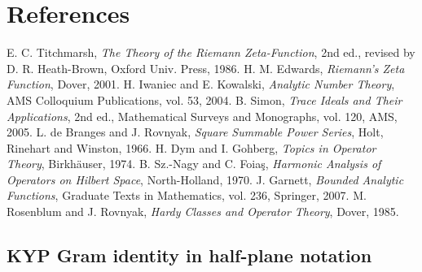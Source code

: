 \documentclass[11pt]{article}
\theoremstyle{definition}
\theoremstyle{remark}
\begin{document}
\section*{References}
\begin{thebibliography}{9}
 E. C. Titchmarsh, \emph{The Theory of the Riemann Zeta-Function}, 2nd ed., revised by D. R. Heath-Brown, Oxford Univ. Press, 1986.
 H. M. Edwards, \emph{Riemann's Zeta Function}, Dover, 2001.
 H. Iwaniec and E. Kowalski, \emph{Analytic Number Theory}, AMS Colloquium Publications, vol. 53, 2004.
 B. Simon, \emph{Trace Ideals and Their Applications}, 2nd ed., Mathematical Surveys and Monographs, vol. 120, AMS, 2005.
 L. de Branges and J. Rovnyak, \emph{Square Summable Power Series}, Holt, Rinehart and Winston, 1966.
 H. Dym and I. Gohberg, \emph{Topics in Operator Theory}, Birkhäuser, 1974.
 B. Sz.-Nagy and C. Foia\c{s}, \emph{Harmonic Analysis of Operators on Hilbert Space}, North-Holland, 1970.
 J. Garnett, \emph{Bounded Analytic Functions}, Graduate Texts in Mathematics, vol. 236, Springer, 2007.
 M. Rosenblum and J. Rovnyak, \emph{Hardy Classes and Operator Theory}, Dover, 1985.
\end{thebibliography}

\subsection{KYP Gram identity in half-plane notation}\label{app:KYP-gram}
\end{document}

